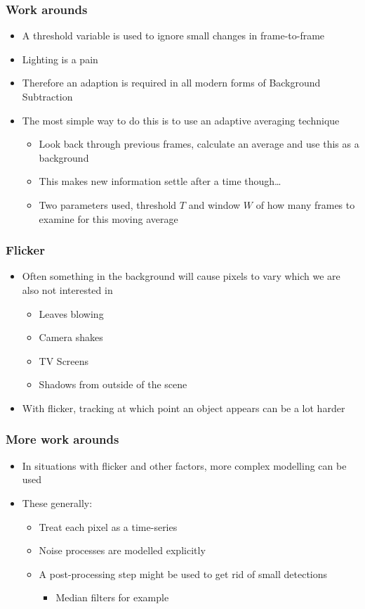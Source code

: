 \documentclass[a4paper]{article}
\begin{document}
\subsubsection{Work arounds}
\label{sec-4-1-1}
\begin{itemize}
\item A threshold variable is used to ignore small changes in frame-to-frame
\item Lighting is a pain
\item Therefore an adaption is required in all modern forms of Background Subtraction
\item The most simple way to do this is to use an adaptive averaging technique
\begin{itemize}
\item Look back through previous frames, calculate an average and use this as a background
\item This makes new information settle after a time though\ldots{}
\item Two parameters used, threshold $T$ and window $W$ of how many frames to examine for this moving average
\end{itemize}
\end{itemize}
\subsubsection{Flicker}
\label{sec-4-1-2}
\begin{itemize}
\item Often something in the background will cause pixels to vary which we are also not interested in
\begin{itemize}
\item Leaves blowing
\item Camera shakes
\item TV Screens
\item Shadows from outside of the scene
\end{itemize}
\item With flicker, tracking at which point an object appears can be a lot harder
\end{itemize}

\subsubsection{More work arounds}
\label{sec-4-1-3}
\begin{itemize}
\item In situations with flicker and other factors, more complex modelling can be used
\item These generally:
\begin{itemize}
\item Treat each pixel as a time-series
\item Noise processes are modelled explicitly
\item A post-processing step might be used to get rid of small detections
\begin{itemize}
\item Median filters for example
\end{itemize}
\end{itemize}
\end{itemize}
\end{document}
